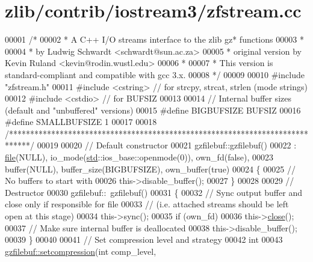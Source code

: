\hypertarget{zlib_2contrib_2iostream3_2zfstream_8cc_source}{}\section{zlib/contrib/iostream3/zfstream.cc}
\label{zlib_2contrib_2iostream3_2zfstream_8cc_source}

\begin{DoxyCode}
00001 \textcolor{comment}{/*}
00002 \textcolor{comment}{ * A C++ I/O streams interface to the zlib gz* functions}
00003 \textcolor{comment}{ *}
00004 \textcolor{comment}{ * by Ludwig Schwardt <schwardt@sun.ac.za>}
00005 \textcolor{comment}{ * original version by Kevin Ruland <kevin@rodin.wustl.edu>}
00006 \textcolor{comment}{ *}
00007 \textcolor{comment}{ * This version is standard-compliant and compatible with gcc 3.x.}
00008 \textcolor{comment}{ */}
00009 
00010 \textcolor{preprocessor}{#include "zfstream.h"}
00011 \textcolor{preprocessor}{#include <cstring>}          \textcolor{comment}{// for strcpy, strcat, strlen (mode strings)}
00012 \textcolor{preprocessor}{#include <cstdio>}           \textcolor{comment}{// for BUFSIZ}
00013 
00014 \textcolor{comment}{// Internal buffer sizes (default and "unbuffered" versions)}
00015 \textcolor{preprocessor}{#define BIGBUFSIZE BUFSIZ}
00016 \textcolor{preprocessor}{#define SMALLBUFSIZE 1}
00017 
00018 \textcolor{comment}{/*****************************************************************************/}
00019 
00020 \textcolor{comment}{// Default constructor}
00021 gzfilebuf::gzfilebuf()
00022 : \hyperlink{structfile}{file}(NULL), io\_mode(\hyperlink{namespacestd}{std}::ios\_base::openmode(0)), own\_fd(false),
00023   buffer(NULL), buffer\_size(BIGBUFSIZE), own\_buffer(true)
00024 \{
00025   \textcolor{comment}{// No buffers to start with}
00026   this->disable\_buffer();
00027 \}
00028 
00029 \textcolor{comment}{// Destructor}
00030 gzfilebuf::~gzfilebuf()
00031 \{
00032   \textcolor{comment}{// Sync output buffer and close only if responsible for file}
00033   \textcolor{comment}{// (i.e. attached streams should be left open at this stage)}
00034   this->sync();
00035   \textcolor{keywordflow}{if} (own\_fd)
00036     this->\hyperlink{classgzofstream_a59e8b01e1c9741085f18ca456c4b8f54}{close}();
00037   \textcolor{comment}{// Make sure internal buffer is deallocated}
00038   this->disable\_buffer();
00039 \}
00040 
00041 \textcolor{comment}{// Set compression level and strategy}
00042 \textcolor{keywordtype}{int}
00043 \hyperlink{classgzfilebuf_ad109ea4fc4ca7cc19d8014b53375255d}{gzfilebuf::setcompression}(\textcolor{keywordtype}{int} comp\_level,

\end{DoxyCode}
